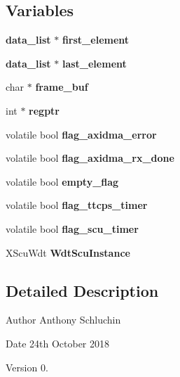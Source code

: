 \subsection*{Variables}
\begin{DoxyCompactItemize}
\item 
\mbox{\label{axis__peripheral_8c_a94f01ed55f54f902dc738539df30427e}} 
\textbf{ data\+\_\+list} $\ast$ {\bfseries first\+\_\+element}
\item 
\mbox{\label{axis__peripheral_8c_ac3c6e218717075ded198514020bb8013}} 
\textbf{ data\+\_\+list} $\ast$ {\bfseries last\+\_\+element}
\item 
\mbox{\label{axis__peripheral_8c_a215c2ec2d3302a5ec51fabb70017e4f9}} 
char $\ast$ {\bfseries frame\+\_\+buf}
\item 
\mbox{\label{axis__peripheral_8c_a39d2cad95814eb9635cca5310d914893}} 
int $\ast$ {\bfseries regptr}
\item 
\mbox{\label{axis__peripheral_8c_a226727c48b3bfd0888096614ee551f89}} 
volatile bool {\bfseries flag\+\_\+axidma\+\_\+error}
\item 
\mbox{\label{axis__peripheral_8c_af3d0d90fb2e8215cab44c4a6c6c268fc}} 
volatile bool {\bfseries flag\+\_\+axidma\+\_\+rx\+\_\+done}
\item 
\mbox{\label{axis__peripheral_8c_ad53968991c134c5dbfc1d0d83e5decdb}} 
volatile bool {\bfseries empty\+\_\+flag}
\item 
\mbox{\label{axis__peripheral_8c_ae1142987fecfa0c02e7edfb9f539805b}} 
volatile bool {\bfseries flag\+\_\+ttcps\+\_\+timer}
\item 
\mbox{\label{axis__peripheral_8c_a92815e63a8bb041c9594c7229d49cd89}} 
volatile bool {\bfseries flag\+\_\+scu\+\_\+timer}
\item 
\mbox{\label{axis__peripheral_8c_afd1f6e74a3d4d317436684e7fa64a8fa}} 
X\+Scu\+Wdt {\bfseries Wdt\+Scu\+Instance}
\end{DoxyCompactItemize}


\subsection{Detailed Description}
\begin{DoxyAuthor}{Author}
Anthony Schluchin 
\end{DoxyAuthor}
\begin{DoxyDate}{Date}
24th October 2018 
\end{DoxyDate}
\begin{DoxyVersion}{Version}
0. 
\end{DoxyVersion}


